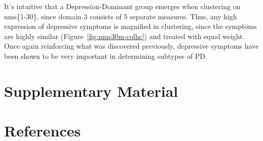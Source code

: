 \documentclass[preprint,3p]{elsarticle} %
\begin{document}
It's intuitive that a Depression-Dominant group emerges when clustering on nms\{1-30\}, since
domain 3 consists of 5 separate measures. Thus, any high expression of depressive symptoms is
magnified in clustering, since the symptoms are highly similar (Figure~\ref{fig:nms30m-colhc}) and
treated with equal weight. Once again reinforcing what was discovered previously, depressive
symptoms have been shown to be very important in determining subtypes of PD.

\section{Supplementary Material}
\section{References}


\end{document}
